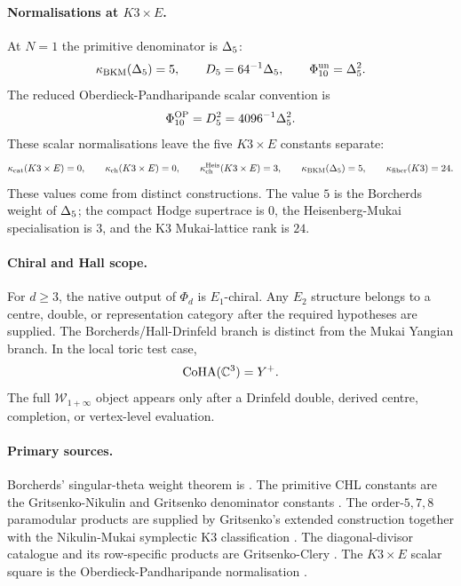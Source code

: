 \paragraph{Normalisations at \(K3\times E\).}
At \(N=1\) the primitive denominator is \(\Delta_5\):
\[
  \kappa_{\mathrm{BKM}}(\Delta_5)=5,\qquad
  D_5=64^{-1}\Delta_5,\qquad
  \Phi_{10}^{\mathrm{un}}=\Delta_5^2.
\]
The reduced Oberdieck-Pandharipande scalar convention is
\[
  \Phi_{10}^{\mathrm{OP}}=D_5^2=4096^{-1}\Delta_5^2.
\]
These scalar normalisations leave the five \(K3\times E\) constants
separate:
\[
  \kappa_{\mathrm{cat}}(K3\times E)=0,\qquad
  \kappa_{\mathrm{ch}}(K3\times E)=0,\qquad
  \kappa_{\mathrm{ch}}^{\mathrm{Heis}}(K3\times E)=3,\qquad
  \kappa_{\mathrm{BKM}}(\Delta_5)=5,\qquad
  \kappa_{\mathrm{fiber}}(K3)=24.
\]
These values come from distinct constructions.  The value \(5\) is the
Borcherds weight of \(\Delta_5\); the compact Hodge supertrace is
\(0\), the Heisenberg-Mukai specialisation is \(3\), and the K3
Mukai-lattice rank is \(24\).

\paragraph{Chiral and Hall scope.}
For \(d\geq3\), the native output of \(\Phi_d\) is \(E_1\)-chiral.
Any \(E_2\) structure belongs to a centre, double, or representation
category after the required hypotheses are supplied.  The
Borcherds/Hall-Drinfeld branch is distinct from the Mukai Yangian
branch.  In the local toric test case,
\[
  \operatorname{CoHA}(\mathbb C^3)=Y^+.
\]
The full \(\mathcal W_{1+\infty}\) object appears only after a
Drinfeld double, derived centre, completion, or vertex-level evaluation.

\paragraph{Primary sources.}
Borcherds' singular-theta weight theorem is \cite{Borcherds1998}.  The
primitive CHL constants are the Gritsenko-Nikulin and Gritsenko
denominator constants \cite{GritsenkoNikulin1998,Gritsenko1999}.  The
order-\(5,7,8\) paramodular products are supplied by Gritsenko's
extended construction \cite{Gritsenko1994} together with the
Nikulin-Mukai symplectic K3 classification
\cite{Nikulin1980,Mukai1988}.  The diagonal-divisor catalogue and its
row-specific products are Gritsenko-Clery \cite{GritsenkoClery2013}.
The \(K3\times E\) scalar square is the Oberdieck-Pandharipande
normalisation \cite{OberdieckPandharipande2018}.
